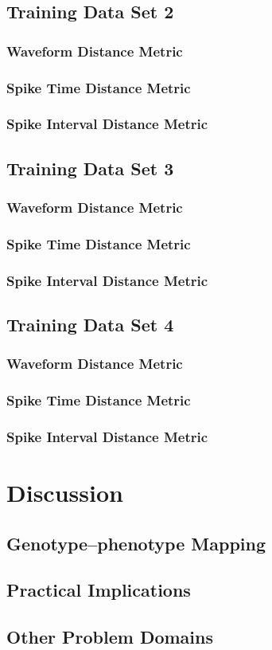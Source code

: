\documentclass[a4paper,12pt]{article}
\begin{document}
\subsection{Training Data Set 2}
\subsubsection{Waveform Distance Metric}


\subsubsection{Spike Time Distance Metric}

\subsubsection{Spike Interval Distance Metric}

\subsection{Training Data Set 3}
\subsubsection{Waveform Distance Metric}

\subsubsection{Spike Time Distance Metric}

\subsubsection{Spike Interval Distance Metric}

\subsection{Training Data Set 4}
\subsubsection{Waveform Distance Metric}

\subsubsection{Spike Time Distance Metric}

\subsubsection{Spike Interval Distance Metric}

\section{Discussion}
\subsection{Genotype--phenotype Mapping}

\subsection{Practical Implications}

\subsection{Other Problem Domains}
\end{document}
